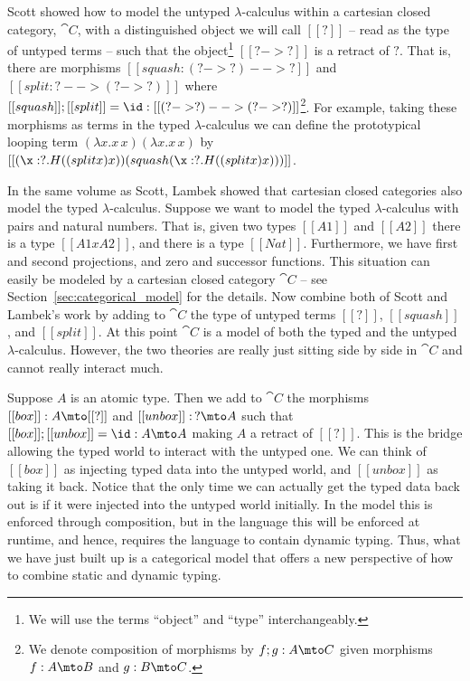 Scott \cite{Scott:1980} showed how to model the untyped
$\lambda$-calculus within a cartesian closed category, $\cat{C}$, with
a distinguished object we will call $[[?]]$ -- read as the type of
untyped terms -- such that the object\footnote{We will use the terms
  ``object'' and ``type'' interchangeably.} $[[? ->?]]$ is a retract
of $?$.  That is, there are morphisms $[[squash : (? -> ?)  --> ?]]$
and $[[split : ?  --> (? -> ?)]]$ where $[[squash]];[[split]] = \id :
[[(? -> ?)  --> (? -> ?)]]$\footnote{We denote composition of
  morphisms by $f;g : A \mto C$ given morphisms $f : A \mto B$ and $g
  : B \mto C$.}.  For example, taking these morphisms as terms in the
typed $\lambda$-calculus we can define the prototypical looping term
$(\lambda x.x\,x)(\lambda x.x\,x)$ by $[[(\x:?.H((split x) x))(squash
    (\x:?.H((split x) x)))]]$.

In the same volume as Scott, Lambek \cite{Lambek:1980} showed that
cartesian closed categories also model the typed
$\lambda$-calculus. Suppose we want to model the typed
$\lambda$-calculus with pairs and natural numbers.  That is, given two
types $[[A1]]$ and $[[A2]]$ there is a type $[[A1 x A2]]$, and there
is a type $[[Nat]]$.  Furthermore, we have first and second
projections, and zero and successor functions. This situation can
easily be modeled by a cartesian closed category $\cat{C}$ -- see
Section~\ref{sec:categorical_model} for the details.  Now combine both
of Scott and Lambek's work by adding to $\cat{C}$ the type of untyped
terms $[[?]]$, $[[squash]]$, and $[[split]]$. At this point $\cat{C}$
is a model of both the typed and the untyped $\lambda$-calculus.
However, the two theories are really just sitting side by side in
$\cat{C}$ and cannot really interact much.

Suppose $A$ is an atomic type.  Then we add to $\cat{C}$ the morphisms
$[[box]] : A \mto [[?]]$ and $[[unbox]] :\, ? \mto A$ such that
$[[box]];[[unbox]] = \id : A \mto A$ making $A$ a retract of $[[?]]$.
This is the bridge allowing the typed world to interact with the
untyped one.  We can think of $[[box]]$ as injecting typed data into
the untyped world, and $[[unbox]]$ as taking it back.  Notice that the
only time we can actually get the typed data back out is if it were
injected into the untyped world initially.  In the model this is
enforced through composition, but in the language this will be
enforced at runtime, and hence, requires the language to contain
dynamic typing.  Thus, what we have just built up is a categorical
model that offers a new perspective of how to combine static and
dynamic typing.

